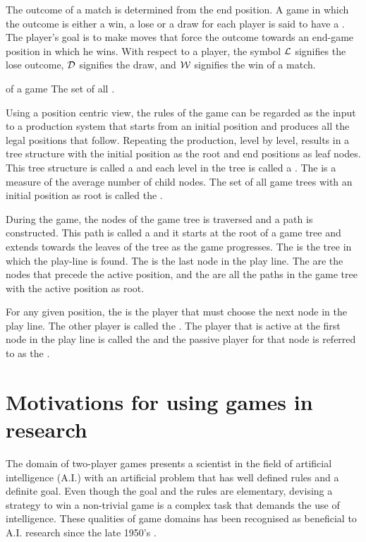The outcome of a match is determined from the end position.  A game in which the outcome is either a win, a lose or a draw for each player is said to have a   \cite{davis:evolve}.  The player's goal is to make moves that force the outcome towards an end-game position in which he wins. With respect to a player, the symbol ${\mathcal L}$ signifies the lose outcome, ${\mathcal D}$ signifies the draw, and ${\mathcal W}$ signifies the win of a match.   

 {of a game} {The set of all .}
 


Using a position centric view, the rules of the game can be regarded as the input to a production system that starts from an initial position and produces all the legal positions that follow.  Repeating the production, level by level, results in a tree structure with the initial position as the root and end positions as leaf nodes. This tree structure is called a  and each level in the tree is called a  \cite{samuel:checkers}.  The  is a measure of the average number of child nodes. The set of all game trees with an initial position as root is called the .  

During the game, the nodes of the game tree is traversed and a path is constructed.  This path is called a  and it starts at the root of a game tree and extends towards the leaves of the tree as the game progresses.  The  is the tree in which the play-line is found. The  is the last node in the play line.  The  are the nodes that precede the active position, and the  are all the paths in the game tree with the active position as root.  

For any given position, the  is the player that must choose the next node in the play line.  The other player is called the .  The player that is active at the first node in the play line is called the  and the passive player for that node is referred to as the .


\section{Motivations for using games in research}
\label{sec:motives}
The domain of two-player games presents a scientist in the field of artificial intelligence (A.I.) with an artificial problem that has well defined rules and a definite goal.  Even though the goal and the rules are elementary, devising a strategy to win a non-trivial game is a complex task that demands the use of intelligence. These qualities of game domains has been recognised as beneficial to A.I. research since the late 1950's \cite{samuel:checkers}.      

